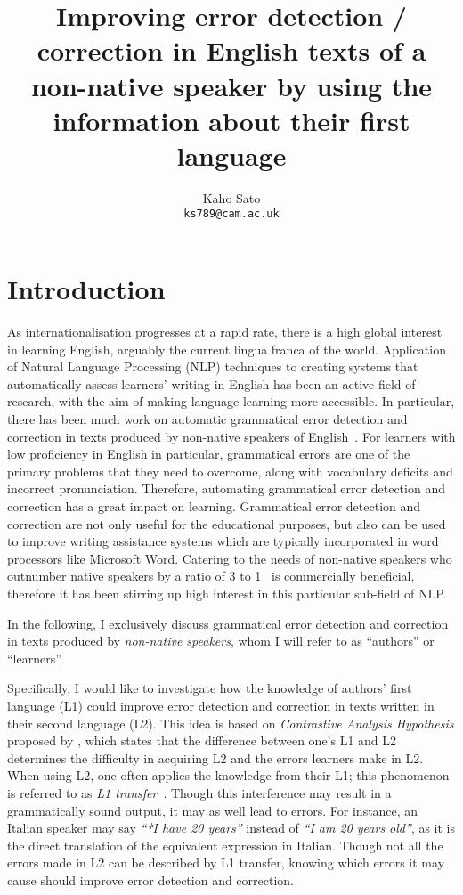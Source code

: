 \documentclass[11pt]{article}
\title{Improving error detection / correction in English texts of a non-native speaker by using the information about their first language}
\author{
 Kaho Sato\\
  \texttt{ks789@cam.ac.uk}
}
\begin{document}
\maketitle

\section{Introduction}
As internationalisation progresses at a rapid rate, there is a high global 
interest in learning English, arguably the current lingua franca of the world. 
Application of Natural Language Processing (NLP) techniques to creating systems 
that automatically assess learners' writing in English has been an active field 
of research, with the aim of making language learning more accessible. In 
particular, there has been much work on automatic grammatical error detection 
and correction in texts produced by non-native speakers of 
English~\citep{izumi2003automatic, eeg2003automatic, han2006detecting, 
tetreault2008ups, de2008classifier, gamon2008using, gamon2010using, 
ng2014conll}.
For learners with low proficiency in English in particular, 
grammatical errors are one of the primary problems that they need to overcome,
along with vocabulary deficits and incorrect pronunciation. 
Therefore, automating grammatical error detection and correction has a great 
impact on learning. Grammatical error detection and correction are not only 
useful for the educational purposes, but also can be used to improve writing 
assistance systems which are typically incorporated in word processors like 
Microsoft Word. Catering to the needs of non-native speakers who outnumber native speakers by a ratio of 3 to 1~\citep{sussex1999david} is commercially 
beneficial, therefore it has been stirring up high interest in this particular 
sub-field of NLP.

In the following, I exclusively discuss grammatical error 
detection and correction in texts produced by \emph{non-native speakers}, whom I will refer to as ``authors'' or ``learners''.

\color{black}Specifically, I would like to investigate how the knowledge of authors' first 
language (L1) could improve error detection and correction in texts 
written in their second language (L2). This idea is based on \emph{Contrastive 
Analysis Hypothesis} proposed by \cite{lado1957linguistics}, which states that 
the difference between one's L1 and L2 determines the difficulty in acquiring L2 and the errors learners make in L2. 
When using L2, one often applies the knowledge from their L1; this phenomenon is referred to as {\em L1 transfer}~\citep{wanner1982language, frenck1997syntactic, 
dussias2003syntactic, nitschke2010first}. Though this interference may result in 
a grammatically sound output, it may as well lead to errors. For instance, an 
Italian speaker may say {\em ``*I have 20 years''} instead of {\em ``I am 20 years old''}, 
as it is the direct translation of the equivalent expression in Italian. Though 
not all the errors made in L2 can be described by L1 transfer, knowing which 
errors it may cause should improve error detection and correction.
\end{document}
